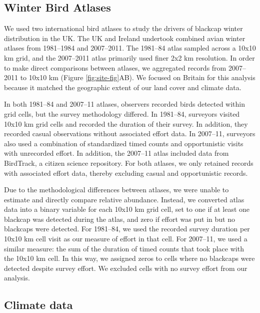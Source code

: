 \documentclass[a4paper, nobind]{templates/ociamthesis}
\begin{document}
\hypertarget{winter-bird-atlases}{%
\subsection{Winter Bird Atlases}\label{winter-bird-atlases}}

We used two international bird atlases to study the drivers of blackcap winter distribution in the UK. The UK and Ireland undertook combined avian winter atlases from 1981--1984 and 2007--2011. The 1981--84 atlas sampled across a 10x10 km grid, and the 2007--2011 atlas primarily used finer 2x2 km resolution. In order to make direct comparisons between atlases, we aggregated records from 2007--2011 to 10x10 km (Figure \ref{fig:site-fig}AB). We focused on Britain for this analysis because it matched the geographic extent of our land cover and climate data.

In both 1981--84 and 2007--11 atlases, observers recorded birds detected within grid cells, but the survey methodology differed. In 1981--84, surveyors visited 10x10 km grid cells and recorded the duration of their survey. In addition, they recorded casual observations without associated effort data. In 2007--11, surveyors also used a combination of standardized timed counts and opportunistic visits with unrecorded effort. In addition, the 2007--11 atlas included data from BirdTrack, a citizen science repository. For both atlases, we only retained records with associated effort data, thereby excluding casual and opportunistic records.

Due to the methodological differences between atlases, we were unable to estimate and directly compare relative abundance. Instead, we converted atlas data into a binary variable for each 10x10 km grid cell, set to one if at least one blackcap was detected during the atlas, and zero if effort was put in but no blackcaps were detected. For 1981--84, we used the recorded survey duration per 10x10 km cell visit as our measure of effort in that cell. For 2007--11, we used a similar measure: the sum of the duration of timed counts that took place with the 10x10 km cell. In this way, we assigned zeros to cells where no blackcaps were detected despite survey effort. We excluded cells with no survey effort from our analysis.

\hypertarget{climate-data}{%
\subsection{Climate data}\label{climate-data}}
\end{document}
